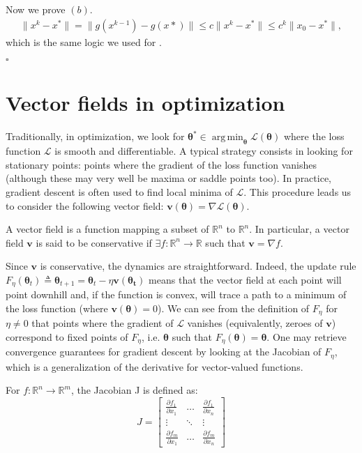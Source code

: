 \documentclass{article}
\DeclareMathOperator*{\argmin}{arg\,min}
\renewcommand{\vec}[1]{\ensuremath{\boldsymbol{#1}}}
\newcommand{\btheta}[0]{\ensuremath{\boldsymbol{\theta}}}
\newcommand{\firstobj}{\mathcal{L}}
\begin{document}
Now we prove $(b)$.
\begin{align*}
    \|x^{k}-x^*\| = \|g(x^{k - 1})-g(x*)\| \leq c\|x^{k}-x^*\| \leq c^k \|x_0 - x^*\|,
\end{align*}
which is the same logic we used for .

\hfill$\square$

\section{Vector fields in optimization}
Traditionally, in optimization, we look for $\btheta^* \in \argmin_{\btheta}\firstobj(\btheta)$ where the loss function $\firstobj$ is smooth and differentiable. A typical strategy consists in looking for stationary points: points where the gradient of the loss function vanishes (although these may very well be maxima or saddle points too). In practice, gradient descent is often used to find local minima of $\firstobj$. This procedure leads us to consider the following vector field: $\vec{v}(\btheta)=\nabla\firstobj(\btheta)$.
\begin{defn}
    A vector field is a function mapping a subset of $\mathbb{R}^n$ to $\mathbb{R}^n$. In particular, a vector field $\vec{v}$ is said to be conservative if $\exists f: \mathbb{R}^n \rightarrow \mathbb{R}$ such that $\vec{v} = \nabla f$.
\end{defn}

Since $\vec{v}$ is conservative, the dynamics are straightforward. Indeed, the update rule $F_\eta(\btheta_t) \triangleq \btheta_{t+1} = \btheta_t - \eta \vec{v}(\vec{\btheta_t})$ means that the vector field at each point will point downhill and, if the function is convex, will trace a path to a minimum of the loss function (where $\vec{v}(\btheta) = 0$). We can see from the definition of $F_\eta$ for $\eta \neq 0$ that points where the gradient of $\mathcal{L}$ vanishes (equivalently, zeroes of $\vec{v}$) correspond to fixed points of $F_\eta$, i.e. $\btheta$ such that $F_\eta(\btheta) = \btheta$. One may retrieve convergence guarantees for gradient descent by looking at the Jacobian of $F_\eta$, which is a generalization of the derivative for vector-valued functions.

\begin{defn}[Jacobian]  For $f: \mathbb{R}^n \rightarrow \mathbb{R}^m$, the Jacobian J is defined as:
\[
    J = 
    \begin{bmatrix} 
        \frac{\partial f_1}{\partial x_1} & \dots & \frac{\partial f_1}{\partial x_n} \\
        \vdots & \ddots & \vdots \\
        \frac{\partial f_m}{\partial x_1} & \dots & \frac{\partial f_m}{\partial x_n} 
    \end{bmatrix}
\]
\end{defn} 
\end{document}
